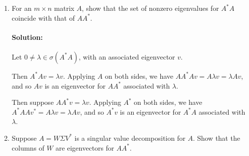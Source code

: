 \documentclass{article}
\begin{document}
\begin{enumerate}
\item For an $m \times  n$ matrix $A$, show that the set of nonzero eigenvalues for $A^*  A$ coincide with that of $AA^* $.
    \paragraph{Solution: }Let $0\neq \lambda\in \sigma(A^* A)$, with an associated eigenvector $v$.

    Then $A^* Av=\lambda v$. Applying $A$ on both sides, we have $A A^*  Av=A\lambda v=\lambda Av$, and so $Av$ is an eigenvector for $A A^* $ associated with $\lambda$.

    Then suppose $A A^*v=\lambda v$. Applying $A^* $ on both sides, we have $A ^*A  Av^*=A\lambda v=\lambda Av$, and so $A^*v$ is an eigenvector for $A ^*A$ associated with $\lambda$.

\item Suppose $A = W \Sigma V^* $ is a singular value decomposition for $A$. Show that the columns of $W$ are eigenvectors for $AA^* $.

\end{enumerate}
\end{document}
